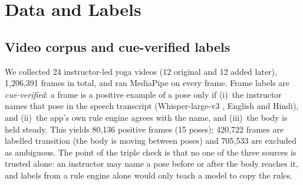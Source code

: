 \section{Data and Labels}\label{sec:data}
\subsection{Video corpus and cue-verified labels}
We collected 24 instructor-led yoga videos (12 original and 12 added later), 1{,}206{,}391 frames in total, and ran MediaPipe on every frame. Frame labels are \emph{cue-verified}: a frame is a positive example of a pose only if (i)~the instructor names that pose in the speech transcript (Whisper-large-v3 \cite{radford2023whisper}, English and Hindi), and (ii)~the app's own rule engine agrees with the name, and (iii)~the body is held steady. This yields 80{,}136 positive frames (15 poses); 420{,}722 frames are labelled transition (the body is moving between poses) and 705{,}533 are excluded as ambiguous. The point of the triple check is that no one of the three sources is trusted alone: an instructor may name a pose before or after the body reaches it, and labels from a rule engine alone would only teach a model to copy the rules.


